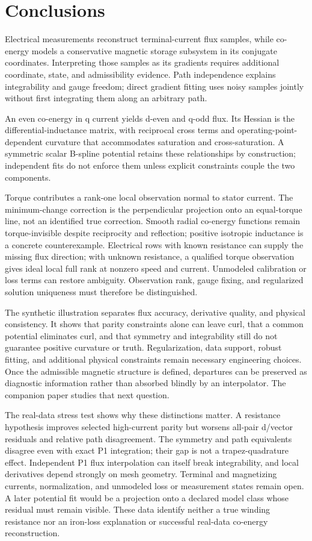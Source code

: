 \section{Conclusions}
Electrical measurements reconstruct terminal-current flux samples, while
co-energy models a conservative magnetic storage subsystem in its conjugate
coordinates. Interpreting those samples as its gradients requires additional
coordinate, state, and admissibility evidence. Path independence explains
integrability and gauge freedom; direct gradient fitting uses noisy samples
jointly without first integrating them along an arbitrary path.

An even co-energy in q current yields d-even and q-odd flux. Its Hessian is
the differential-inductance matrix, with reciprocal cross terms and
operating-point-dependent curvature that accommodates saturation and
cross-saturation. A symmetric scalar B-spline potential retains these
relationships by construction; independent fits do not enforce them unless
explicit constraints couple the two components.

Torque contributes a rank-one local observation normal to stator current.
The minimum-change correction is the perpendicular projection onto an
equal-torque line, not an identified true correction. Smooth radial
co-energy functions remain torque-invisible despite reciprocity and
reflection; positive isotropic inductance is a concrete counterexample.
Electrical rows with known resistance can supply the missing flux direction;
with unknown resistance, a qualified torque observation gives ideal local
full rank at nonzero speed and current. Unmodeled calibration or loss terms
can restore ambiguity. Observation rank, gauge fixing, and regularized
solution uniqueness must therefore be distinguished.

The synthetic illustration separates flux accuracy, derivative quality, and
physical consistency. It shows that parity constraints alone can leave curl,
that a common potential eliminates curl, and that symmetry and integrability
still do not guarantee positive curvature or truth. Regularization, data
support, robust fitting, and additional physical constraints remain necessary
engineering choices. Once the admissible magnetic structure is defined,
departures can be preserved as diagnostic information rather than absorbed
blindly by an interpolator. The companion paper studies that next question.

The real-data stress test shows why these distinctions matter. A resistance
hypothesis improves selected high-current parity but worsens all-pair d/vector
residuals and relative path disagreement. The symmetry and path equivalents
disagree even with exact P1 integration; their gap is not a trapez-quadrature
effect. Independent P1 flux interpolation can itself break integrability,
and local derivatives depend strongly on mesh geometry. Terminal and
magnetizing currents, normalization, and unmodeled loss or measurement states
remain open. A later potential fit would be a projection onto a declared
model class whose residual must remain visible. These data identify neither
a true winding resistance nor an iron-loss explanation or successful real-data
co-energy reconstruction.

